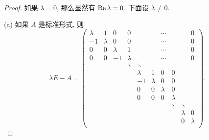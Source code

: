 \documentclass[color=black,device=normal,lang=cn,mode=geye]{elegantnote}
\begin{document}
\begin{proof}
    如果 $\lambda=0$, 那么显然有 $\operatorname{Re}\lambda=0$. 下面设 $\lambda\neq0$.

    (a) 如果 $A$ 是标准形式, 则
    \[\lambda E-A=\begin{pmatrix}
        \lambda  & 1 & 0  & 0 &&& \cdots &&& 0 \\
        -1 & \lambda & 0  & 0 &&& \cdots &&& 0 \\
        0  & 0 & \lambda  & 1 &&& \cdots &&& 0 \\
        0  & 0 & -1 & \lambda &&& \cdots &&& 0 \\
        &&& \ddots & \ddots \\
        &&&& \lambda  & 1 & 0 & 0 \\
        &&&& -1 & \lambda & 0 & 0 \\
        &&&& 0  & 0 & \lambda & 0 \\
        &&&& 0  & 0 & 0 & \lambda \\
        &&&&&&& \ddots & \ddots \\
        &&&&&&&& \lambda & 0 \\
        &&&&&&&& 0 & \lambda \\
    \end{pmatrix}.\]


\end{proof}
\end{document}
